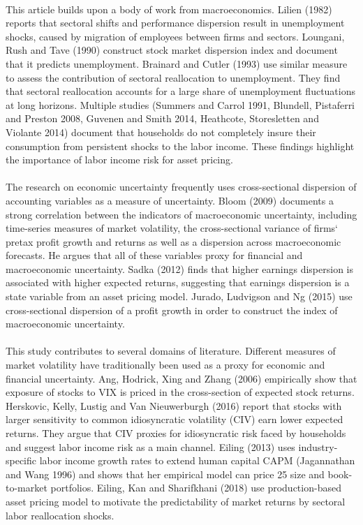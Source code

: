 \documentclass[12pt]{article}
\begin{document}
\paragraph{}
This article builds upon a body of work from macroeconomics. Lilien (1982) reports that sectoral shifts and performance dispersion result in unemployment shocks, caused by migration of employees between firms and sectors. Loungani, Rush and Tave (1990) construct stock market dispersion index and document that it predicts unemployment. Brainard and Cutler (1993) use similar measure to assess the contribution of sectoral reallocation to unemployment. They find that sectoral reallocation accounts for a large share of unemployment fluctuations at long horizons. Multiple studies (Summers and Carrol 1991, Blundell, Pistaferri and Preston 2008, Guvenen and Smith 2014, Heathcote, Storesletten and Violante 2014) document that households do not completely insure their consumption from persistent shocks to the labor income. These findings highlight the importance of labor income risk for asset pricing.
\paragraph{}
The research on economic uncertainty frequently uses cross-sectional dispersion of accounting variables as a measure of uncertainty. Bloom (2009) documents a strong correlation between the indicators of macroeconomic uncertainty, including time-series measures of market volatility, the cross-sectional variance of firms` pretax profit growth and returns as well as a dispersion across macroeconomic forecasts. He argues that all of these variables proxy for financial and macroeconomic uncertainty. Sadka (2012) finds that higher earnings dispersion is associated with higher expected returns, suggesting that earnings dispersion is a state variable from an asset pricing model. Jurado, Ludvigson and Ng (2015) use cross-sectional dispersion of a profit growth in order to construct the index of macroeconomic uncertainty.
\paragraph{}
This study contributes to several domains of literature. Different measures of market volatility have traditionally been used as a proxy for economic and financial uncertainty. Ang, Hodrick, Xing and Zhang (2006) empirically show that exposure of stocks to VIX is priced in the cross-section of expected stock returns. Herskovic, Kelly, Lustig and Van Nieuwerburgh (2016) report that stocks with larger sensitivity to common idiosyncratic volatility (CIV) earn lower expected returns. They argue that CIV proxies for idiosyncratic risk faced by households and suggest labor income risk as a main channel. Eiling (2013) uses industry-specific labor income growth rates to extend human capital CAPM (Jagannathan and Wang 1996) and shows that her empirical model can price 25 size and book-to-market portfolios. Eiling, Kan and Sharifkhani (2018) use production-based asset pricing model to motivate the predictability of market returns by sectoral labor reallocation shocks. 
\end{document}
